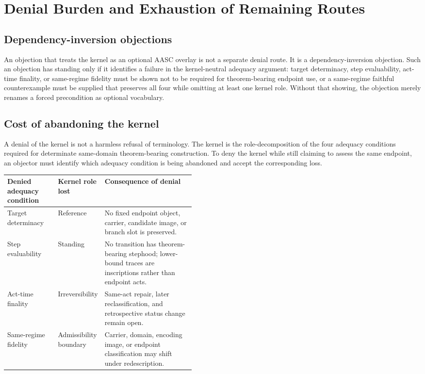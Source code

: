 \documentclass[11pt]{article}
\theoremstyle{definition}
\theoremstyle{remark}
\begin{document}
\section{Denial Burden and Exhaustion of Remaining Routes}\label{sec:denial-burden}

\subsection*{Dependency-inversion objections}
An objection that treats the kernel as an optional AASC overlay is not a separate denial route. It is a dependency-inversion objection. Such an objection has standing only if it identifies a failure in the kernel-neutral adequacy argument: target determinacy, step evaluability, act-time finality, or same-regime fidelity must be shown not to be required for theorem-bearing endpoint use, or a same-regime faithful counterexample must be supplied that preserves all four while omitting at least one kernel role. Without that showing, the objection merely renames a forced precondition as optional vocabulary.

\subsection*{Cost of abandoning the kernel}
A denial of the kernel is not a harmless refusal of terminology. The kernel is the role-decomposition of the four adequacy conditions required for determinate same-domain theorem-bearing construction. To deny the kernel while still claiming to assess the same endpoint, an objector must identify which adequacy condition is being abandoned and accept the corresponding loss.

\begin{center}
\small
\begin{tabularx}{\linewidth}{>{\raggedright\arraybackslash}p{0.27\linewidth}>{\raggedright\arraybackslash}p{0.18\linewidth}X}
\toprule
Denied adequacy condition & Kernel role lost & Consequence of denial \\
\midrule
Target determinacy & Reference & No fixed endpoint object, carrier, candidate image, or branch slot is preserved. \\
Step evaluability & Standing & No transition has theorem-bearing stephood; lower-bound traces are inscriptions rather than endpoint acts. \\
Act-time finality & Irreversibility & Same-act repair, later reclassification, and retrospective status change remain open. \\
Same-regime fidelity & Admissibility boundary & Carrier, domain, encoding image, or endpoint classification may shift under redescription. \\
\bottomrule
\end{tabularx}
\end{center}
\end{document}
